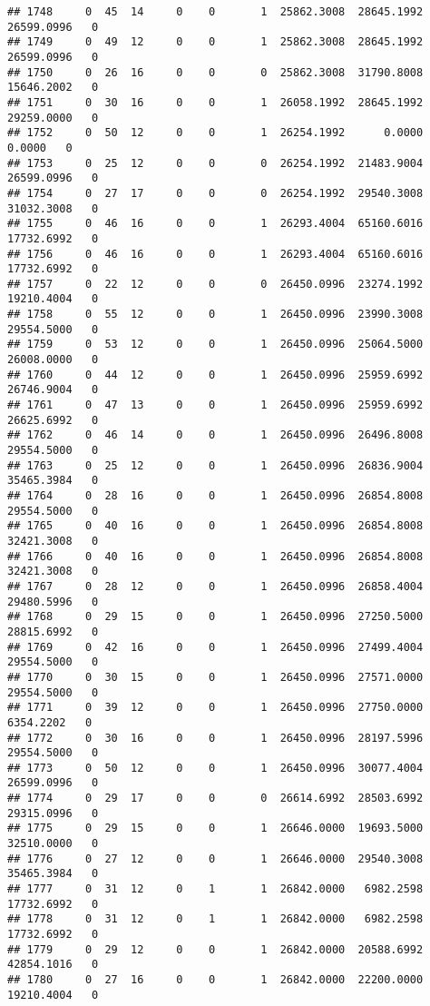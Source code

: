 \documentclass[
]{article}
\begin{document}
\begin{enumerate}
\begin{verbatim}
## 1748     0  45  14     0    0       1  25862.3008  28645.1992  26599.0996   0
## 1749     0  49  12     0    0       1  25862.3008  28645.1992  26599.0996   0
## 1750     0  26  16     0    0       0  25862.3008  31790.8008  15646.2002   0
## 1751     0  30  16     0    0       1  26058.1992  28645.1992  29259.0000   0
## 1752     0  50  12     0    0       1  26254.1992      0.0000      0.0000   0
## 1753     0  25  12     0    0       0  26254.1992  21483.9004  26599.0996   0
## 1754     0  27  17     0    0       0  26254.1992  29540.3008  31032.3008   0
## 1755     0  46  16     0    0       1  26293.4004  65160.6016  17732.6992   0
## 1756     0  46  16     0    0       1  26293.4004  65160.6016  17732.6992   0
## 1757     0  22  12     0    0       0  26450.0996  23274.1992  19210.4004   0
## 1758     0  55  12     0    0       1  26450.0996  23990.3008  29554.5000   0
## 1759     0  53  12     0    0       1  26450.0996  25064.5000  26008.0000   0
## 1760     0  44  12     0    0       1  26450.0996  25959.6992  26746.9004   0
## 1761     0  47  13     0    0       1  26450.0996  25959.6992  26625.6992   0
## 1762     0  46  14     0    0       1  26450.0996  26496.8008  29554.5000   0
## 1763     0  25  12     0    0       1  26450.0996  26836.9004  35465.3984   0
## 1764     0  28  16     0    0       1  26450.0996  26854.8008  29554.5000   0
## 1765     0  40  16     0    0       1  26450.0996  26854.8008  32421.3008   0
## 1766     0  40  16     0    0       1  26450.0996  26854.8008  32421.3008   0
## 1767     0  28  12     0    0       1  26450.0996  26858.4004  29480.5996   0
## 1768     0  29  15     0    0       1  26450.0996  27250.5000  28815.6992   0
## 1769     0  42  16     0    0       1  26450.0996  27499.4004  29554.5000   0
## 1770     0  30  15     0    0       1  26450.0996  27571.0000  29554.5000   0
## 1771     0  39  12     0    0       1  26450.0996  27750.0000   6354.2202   0
## 1772     0  30  16     0    0       1  26450.0996  28197.5996  29554.5000   0
## 1773     0  50  12     0    0       1  26450.0996  30077.4004  26599.0996   0
## 1774     0  29  17     0    0       0  26614.6992  28503.6992  29315.0996   0
## 1775     0  29  15     0    0       1  26646.0000  19693.5000  32510.0000   0
## 1776     0  27  12     0    0       1  26646.0000  29540.3008  35465.3984   0
## 1777     0  31  12     0    1       1  26842.0000   6982.2598  17732.6992   0
## 1778     0  31  12     0    1       1  26842.0000   6982.2598  17732.6992   0
## 1779     0  29  12     0    0       1  26842.0000  20588.6992  42854.1016   0
## 1780     0  27  16     0    0       1  26842.0000  22200.0000  19210.4004   0

\end{verbatim}
\end{enumerate}
\end{document}
